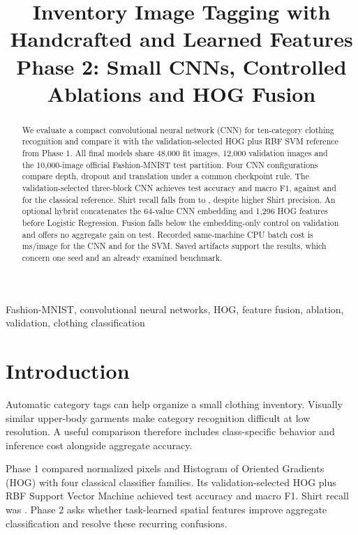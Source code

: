 \documentclass[conference]{IEEEtran}
\begin{document}
\title{Inventory Image Tagging with Handcrafted and Learned Features\\
\large Phase 2: Small CNNs, Controlled Ablations and HOG Fusion}
\ifdefined\IncludePrivateAuthors

\else
\author{
}
\fi
\maketitle

\begin{abstract}
We evaluate a compact convolutional neural network (CNN) for ten-category clothing
recognition and compare it with the validation-selected HOG plus RBF SVM reference
from Phase 1. All final models share 48,000 fit images, 12,000 validation images and
the 10,000-image official Fashion-MNIST test partition. Four CNN configurations
compare depth, dropout and translation under a common checkpoint rule. The
validation-selected three-block CNN achieves \CnnAccuracy{} test accuracy and
\CnnFone{} macro F1, against \SvmAccuracy{} and \SvmFone{} for the classical reference.
Shirt recall falls from \SvmShirt{} to \CnnShirt{}, despite higher Shirt precision.
An optional hybrid concatenates the 64-value CNN embedding and 1,296 HOG features
before Logistic Regression. Fusion falls below the embedding-only control on
validation and offers no aggregate gain on test. Recorded same-machine CPU
batch cost is \CnnTime{} ms/image for the CNN and \SvmTime{} for the SVM.
Saved artifacts support the results, which concern one seed and an already examined benchmark.
\end{abstract}

\begin{IEEEkeywords}
Fashion-MNIST, convolutional neural networks, HOG, feature fusion, ablation,
validation, clothing classification
\end{IEEEkeywords}

\section{Introduction}
Automatic category tags can help organize a small clothing inventory. Visually
similar upper-body garments make category recognition difficult at low
resolution. A useful comparison therefore includes class-specific behavior and
inference cost alongside aggregate accuracy.

Phase 1 compared normalized pixels and Histogram of Oriented Gradients (HOG)
with four classical classifier families. Its validation-selected HOG plus RBF
Support Vector Machine achieved \SvmAccuracy{} test accuracy and \SvmFone{} macro F1.
Shirt recall was \SvmShirt{}. Phase 2 asks whether task-learned spatial features
improve aggregate classification and resolve these recurring confusions.
\end{document}
